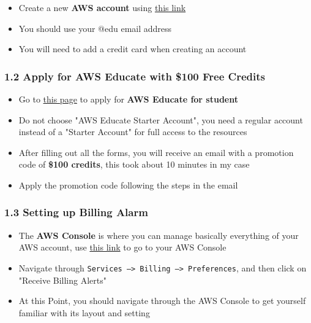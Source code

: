 \documentclass[]{article}
\begin{document}
\begin{itemize}
\item
  Create a new \textbf{AWS account} using
  \href{https://portal.aws.amazon.com/billing/signup\#/start}{this link}
\item
  You should use your @edu email address
\item
  You will need to add a credit card when creating an account
\end{itemize}

\hypertarget{header-n54}{%
\subsubsection{1.2 Apply for AWS Educate with \$100 Free
Credits}\label{header-n54}}

\begin{itemize}
\item
  Go to \href{https://aws.amazon.com/education/awseducate/}{this page}
  to apply for \textbf{AWS Educate for student}
\item
  Do not choose "AWS Educate Starter Account", you need a regular
  account instead of a "Starter Account" for full access to the
  resources
\item
  After filling out all the forms, you will receive an email with a
  promotion code of \textbf{\$100 credits}, this took about 10 minutes
  in my case
\item
  Apply the promotion code following the steps in the email
\end{itemize}

\hypertarget{header-n68}{%
\subsubsection{1.3 Setting up Billing Alarm}\label{header-n68}}

\begin{itemize}
\item
  The \textbf{AWS Console} is where you can manage basically everything
  of your AWS account, use \href{https://console.aws.amazon.com/}{this
  link} to go to your AWS Console
\item
  Navigate through
  \texttt{Services\ —\textgreater{}\ Billing\ —\textgreater{}\ Preferences},
  and then click on "Receive Billing Alerts"
\item
  At this Point, you should navigate through the AWS Console to get
  yourself familiar with its layout and setting
\end{itemize}
\end{document}

